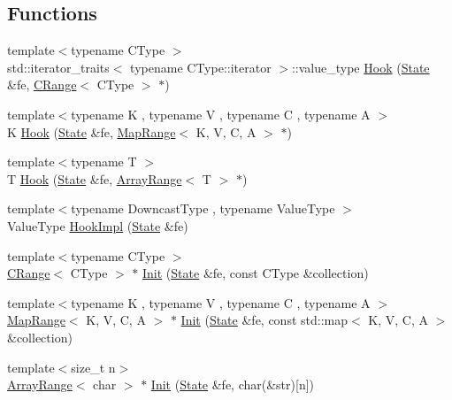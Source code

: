 \subsection*{Functions}
\begin{DoxyCompactItemize}
\item 
{\footnotesize template$<$typename C\+Type $>$ }\\std\+::iterator\+\_\+traits$<$ typename C\+Type\+::iterator $>$\+::value\+\_\+type \mbox{\hyperlink{namespace__fe_a8cbabb96de19ff26050daf1352fe6699}{Hook}} (\mbox{\hyperlink{struct__fe_1_1State}{State}} \&fe, \mbox{\hyperlink{struct__fe_1_1CRange}{C\+Range}}$<$ C\+Type $>$ $\ast$)
\item 
{\footnotesize template$<$typename K , typename V , typename C , typename A $>$ }\\K \mbox{\hyperlink{namespace__fe_a8597877c002e4e1fd42c063237d6d256}{Hook}} (\mbox{\hyperlink{struct__fe_1_1State}{State}} \&fe, \mbox{\hyperlink{struct__fe_1_1MapRange}{Map\+Range}}$<$ K, V, C, A $>$ $\ast$)
\item 
{\footnotesize template$<$typename T $>$ }\\T \mbox{\hyperlink{namespace__fe_a14840a14fb52c02bcb9d15d0dab78c58}{Hook}} (\mbox{\hyperlink{struct__fe_1_1State}{State}} \&fe, \mbox{\hyperlink{struct__fe_1_1ArrayRange}{Array\+Range}}$<$ T $>$ $\ast$)
\item 
{\footnotesize template$<$typename Downcast\+Type , typename Value\+Type $>$ }\\Value\+Type \mbox{\hyperlink{namespace__fe_a6aa30c5ead5c409df035e7be1659fd6f}{Hook\+Impl}} (\mbox{\hyperlink{struct__fe_1_1State}{State}} \&fe)
\item 
{\footnotesize template$<$typename C\+Type $>$ }\\\mbox{\hyperlink{struct__fe_1_1CRange}{C\+Range}}$<$ C\+Type $>$ $\ast$ \mbox{\hyperlink{namespace__fe_ab52430a70b90e012572f22d6cc8ce2c6}{Init}} (\mbox{\hyperlink{struct__fe_1_1State}{State}} \&fe, const C\+Type \&collection)
\item 
{\footnotesize template$<$typename K , typename V , typename C , typename A $>$ }\\\mbox{\hyperlink{struct__fe_1_1MapRange}{Map\+Range}}$<$ K, V, C, A $>$ $\ast$ \mbox{\hyperlink{namespace__fe_a6915d77d3a0b12e3f6c2df62f91d0384}{Init}} (\mbox{\hyperlink{struct__fe_1_1State}{State}} \&fe, const std\+::map$<$ K, V, C, A $>$ \&collection)
\item 
{\footnotesize template$<$size\+\_\+t n$>$ }\\\mbox{\hyperlink{struct__fe_1_1ArrayRange}{Array\+Range}}$<$ char $>$ $\ast$ \mbox{\hyperlink{namespace__fe_a4012c80921f7f917e93984043e45489c}{Init}} (\mbox{\hyperlink{struct__fe_1_1State}{State}} \&fe, char(\&str)\mbox{[}n\mbox{]})

\end{DoxyCompactItemize}
